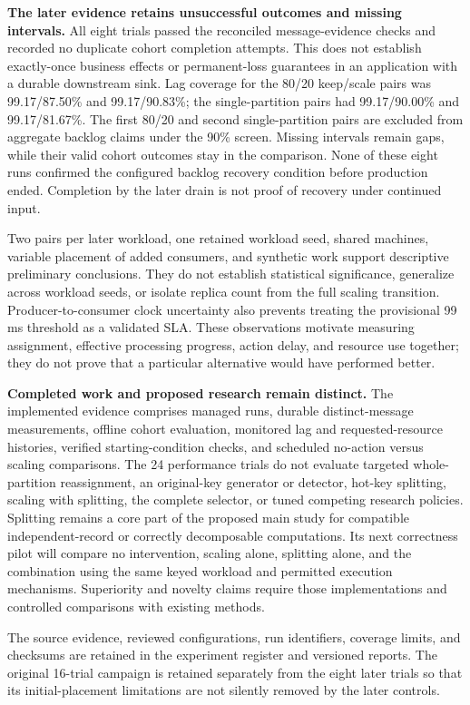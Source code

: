 \textbf{The later evidence retains unsuccessful outcomes and missing intervals.} All eight trials passed the reconciled message-evidence checks and recorded no duplicate cohort completion attempts. This does not establish exactly-once business effects or permanent-loss guarantees in an application with a durable downstream sink. Lag coverage for the 80/20 keep/scale pairs was 99.17/87.50\% and 99.17/90.83\%; the single-partition pairs had 99.17/90.00\% and 99.17/81.67\%. The first 80/20 and second single-partition pairs are excluded from aggregate backlog claims under the 90\% screen. Missing intervals remain gaps, while their valid cohort outcomes stay in the comparison. None of these eight runs confirmed the configured backlog recovery condition before production ended. Completion by the later drain is not proof of recovery under continued input.

Two pairs per later workload, one retained workload seed, shared machines, variable placement of added consumers, and synthetic work support descriptive preliminary conclusions. They do not establish statistical significance, generalize across workload seeds, or isolate replica count from the full scaling transition. Producer-to-consumer clock uncertainty also prevents treating the provisional 99 ms threshold as a validated SLA. These observations motivate measuring assignment, effective processing progress, action delay, and resource use together; they do not prove that a particular alternative would have performed better.

\textbf{Completed work and proposed research remain distinct.} The implemented evidence comprises managed runs, durable distinct-message measurements, offline cohort evaluation, monitored lag and requested-resource histories, verified starting-condition checks, and scheduled no-action versus scaling comparisons. The 24 performance trials do not evaluate targeted whole-partition reassignment, an original-key generator or detector, hot-key splitting, scaling with splitting, the complete selector, or tuned competing research policies. Splitting remains a core part of the proposed main study for compatible independent-record or correctly decomposable computations. Its next correctness pilot will compare no intervention, scaling alone, splitting alone, and the combination using the same keyed workload and permitted execution mechanisms. Superiority and novelty claims require those implementations and controlled comparisons with existing methods.

The source evidence, reviewed configurations, run identifiers, coverage limits, and checksums are retained in the experiment register and versioned reports. The original 16-trial campaign is retained separately from the eight later trials so that its initial-placement limitations are not silently removed by the later controls.
